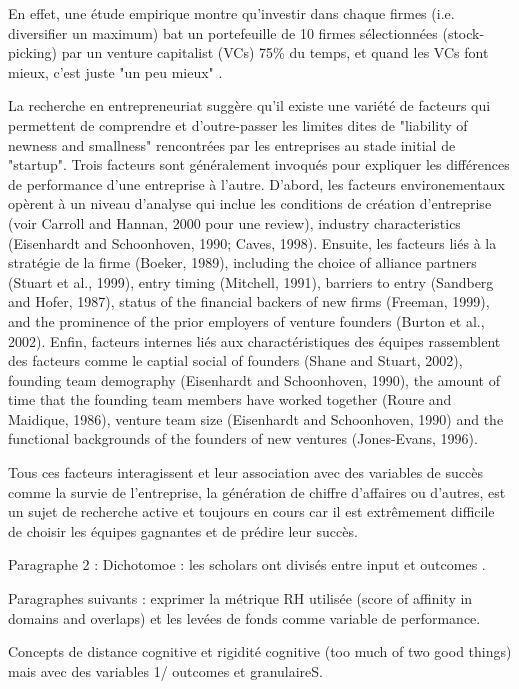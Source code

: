 \documentclass[12pt]{article}
\begin{document}
En effet, une étude empirique montre qu'investir dans chaque firmes (i.e. diversifier un maximum) bat un portefeuille de 10 firmes sélectionnées (stock-picking) par un venture capitalist (VCs) 75\% du temps, et quand les VCs font mieux, c'est juste "un peu mieux" \citep{othman2020angelistdata}.

La recherche en entrepreneuriat suggère qu'il existe une variété de facteurs qui permettent de comprendre et d'outre-passer les limites dites de "liability of newness and smallness" rencontrées par les entreprises au stade initial de "startup". Trois facteurs sont généralement invoqués pour expliquer les différences de performance d'une entreprise à l'autre. D'abord, les facteurs environementaux opèrent à un niveau d'analyse qui inclue les conditions de création d'entreprise (voir Carroll and Hannan, 2000 pour une review), industry characteristics (Eisenhardt and Schoonhoven, 1990; Caves, 1998). Ensuite, les facteurs liés à la stratégie de la firme (Boeker, 1989), including the choice of alliance partners (Stuart et al., 1999), entry timing (Mitchell, 1991), barriers to entry (Sandberg and Hofer, 1987), status of the financial backers of new firms (Freeman, 1999), and the prominence of the prior employers of venture founders (Burton et al., 2002). Enfin, facteurs internes liés aux charactéristiques des équipes rassemblent des facteurs comme le captial social of founders (Shane and Stuart, 2002), founding team demography (Eisenhardt and Schoonhoven, 1990), the amount of time that the founding team members have worked together (Roure and Maidique, 1986), venture team size (Eisenhardt and Schoonhoven, 1990) and the functional backgrounds of the founders of new ventures (Jones-Evans, 1996).

Tous ces facteurs interagissent et leur association avec des variables de succès comme la survie de l'entreprise, la génération de chiffre d'affaires ou d'autres, est un sujet de recherche active et toujours en cours car il est extrêmement difficile de choisir les équipes gagnantes et de prédire leur succès.

Paragraphe 2 : Dichotomoe : les scholars ont divisés entre input et outcomes \citep{marvel2016human}.

Paragraphes suivants : exprimer la métrique RH utilisée (score of affinity in domains and overlaps) et les levées de fonds comme variable de performance.

Concepts de distance cognitive et rigidité cognitive (too much of two good things) mais avec des variables 1/ outcomes et granulaireS.
\end{document}
